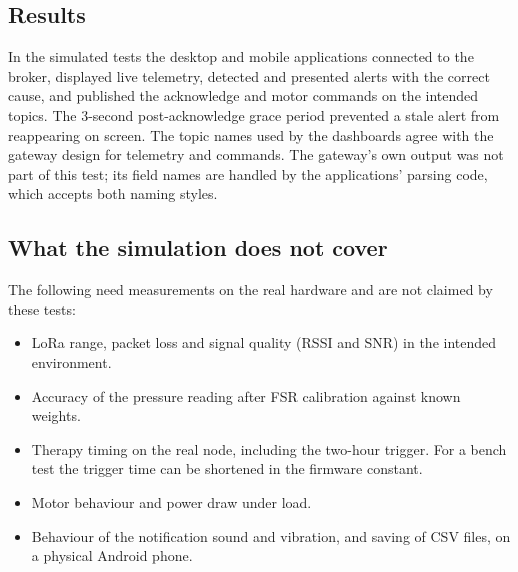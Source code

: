 \subsection{Results}
In the simulated tests the desktop and mobile applications connected to the broker, displayed live telemetry, detected and presented alerts with the correct cause, and published the acknowledge and motor commands on the intended topics. The 3-second post-acknowledge grace period prevented a stale alert from reappearing on screen. The topic names used by the dashboards agree with the gateway design for telemetry and commands. The gateway's own output was not part of this test; its field names are handled by the applications' parsing code, which accepts both naming styles.

\subsection{What the simulation does not cover}
\label{sec:notcovered}
The following need measurements on the real hardware and are not claimed by these tests:
\begin{itemize}
\item LoRa range, packet loss and signal quality (RSSI and SNR) in the intended environment.
\item Accuracy of the pressure reading after FSR calibration against known weights.
\item Therapy timing on the real node, including the two-hour trigger. For a bench test the trigger time can be shortened in the firmware constant.
\item Motor behaviour and power draw under load.
\item Behaviour of the notification sound and vibration, and saving of CSV files, on a physical Android phone.
\end{itemize}

